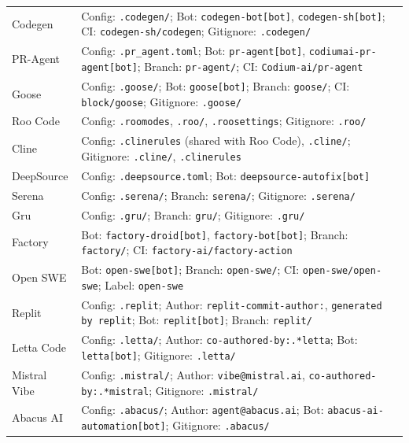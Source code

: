 \documentclass[10pt,a4paper]{article}
\begin{document}
\begin{longtable}{L{2.8cm}L{10.7cm}}
Codegen &
  Config: \texttt{.codegen/};
  Bot: \texttt{codegen-bot[bot]}, \texttt{codegen-sh[bot]};
  CI: \texttt{codegen-sh/codegen};
  Gitignore: \texttt{.codegen/} \\
PR-Agent &
  Config: \texttt{.pr\_agent.toml};
  Bot: \texttt{pr-agent[bot]}, \texttt{codiumai-pr-agent[bot]};
  Branch: \texttt{pr-agent/};
  CI: \texttt{Codium-ai/pr-agent} \\
Goose &
  Config: \texttt{.goose/};
  Bot: \texttt{goose[bot]};
  Branch: \texttt{goose/};
  CI: \texttt{block/goose};
  Gitignore: \texttt{.goose/} \\
Roo Code &
  Config: \texttt{.roomodes}, \texttt{.roo/}, \texttt{.roosettings};
  Gitignore: \texttt{.roo/} \\
Cline &
  Config: \texttt{.clinerules} (shared with Roo Code), \texttt{.cline/};
  Gitignore: \texttt{.cline/}, \texttt{.clinerules} \\
DeepSource &
  Config: \texttt{.deepsource.toml};
  Bot: \texttt{deepsource-autofix[bot]} \\
Serena &
  Config: \texttt{.serena/};
  Branch: \texttt{serena/};
  Gitignore: \texttt{.serena/} \\
Gru &
  Config: \texttt{.gru/};
  Branch: \texttt{gru/};
  Gitignore: \texttt{.gru/} \\
Factory &
  Bot: \texttt{factory-droid[bot]}, \texttt{factory-bot[bot]};
  Branch: \texttt{factory/};
  CI: \texttt{factory-ai/factory-action} \\
Open SWE &
  Bot: \texttt{open-swe[bot]};
  Branch: \texttt{open-swe/};
  CI: \texttt{open-swe/open-swe};
  Label: \texttt{open-swe} \\
Replit &
  Config: \texttt{.replit};
  Author: \texttt{replit-commit-author:}, \texttt{generated by replit};
  Bot: \texttt{replit[bot]};
  Branch: \texttt{replit/} \\
Letta Code &
  Config: \texttt{.letta/};
  Author: \texttt{co-authored-by:.*letta};
  Bot: \texttt{letta[bot]};
  Gitignore: \texttt{.letta/} \\
Mistral Vibe &
  Config: \texttt{.mistral/};
  Author: \texttt{vibe@mistral.ai}, \texttt{co-authored-by:.*mistral};
  Gitignore: \texttt{.mistral/} \\
Abacus AI &
  Config: \texttt{.abacus/};
  Author: \texttt{agent@abacus.ai};
  Bot: \texttt{abacus-ai-automation[bot]};
  Gitignore: \texttt{.abacus/} \\

\end{longtable}
\end{document}
